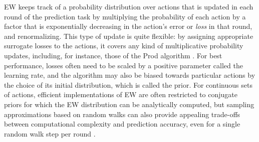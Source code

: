 \documentclass{colt2018} %
\begin{document}
EW keeps track of a probability distribution over actions
that is updated in each round of the prediction task by multiplying the
probability of each action by a factor that is exponentially decreasing
in the action's error or \emph{loss} in that round, and renormalizing.
This type of update is quite flexible: by assigning appropriate
surrogate losses to the actions, it covers any kind of multiplicative
probability updates, including, for instance, those of the Prod
algorithm \citep{CesaBianchiMansourStoltz2007}. For best performance,
losses often need to be scaled by a positive parameter called the
learning rate, and the algorithm may also be biased towards particular
actions by the choice of its initial distribution, which is called the
prior. For continuous sets of actions, efficient implementations of EW
are often restricted to conjugate priors for which the EW distribution
can be analytically computed, but sampling approximations based on
random walks can also provide appealing trade-offs between computational
complexity and prediction accuracy, even for a single random walk step
per round
\citep{NarayananRakhlin2017,kalai2002efficient}.
\end{document}
